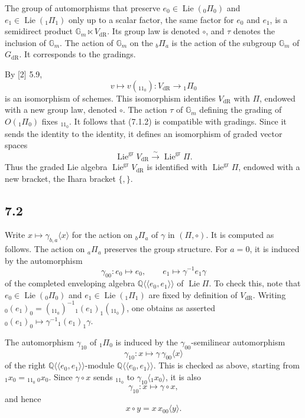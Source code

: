 \documentclass[10pt]{article}
\newcommand{\Q}{\mathbb Q}
\newcommand{\Gm}{\mathbb G_m}
\newcommand{\Lie}{\operatorname{Lie}}
\newcommand{\dR}{\mathrm{dR}}
\begin{document}
The group of automorphisms that preserve $e_0\in\Lie({}_0\Pi_0)$ and $e_1\in\Lie({}_1\Pi_1)$ only up to a scalar factor, the same factor for $e_0$ and $e_1$, is a semidirect product $\Gm\ltimes V_{\dR}$. Its group law is denoted $\circ$, and $\tau$ denotes the inclusion of $\Gm$. The action of $\Gm$ on the ${}_b\Pi_a$ is the action of the subgroup $\Gm$ of $G_{\dR}$. It corresponds to the gradings.

By [2] 5.9,
\begin{equation}
v\longmapsto v({}_11_0):V_{\dR}\longrightarrow {}_1\Pi_0
\tag{7.1.2}
\end{equation}
is an isomorphism of schemes. This isomorphism identifies $V_{\dR}$ with $\Pi$, endowed with a new group law, denoted $\circ$. The action $\tau$ of $\Gm$ defining the grading of $O({}_1\Pi_0)$ fixes ${}_11_0$. It follows that (7.1.2) is compatible with gradings. Since it sends the identity to the identity, it defines an isomorphism of graded vector spaces
\begin{equation}
\Lie^{\mathrm{gr}}V_{\dR}\overset{\sim}{\longrightarrow}\Lie^{\mathrm{gr}}\Pi.
\tag{7.1.3}
\end{equation}
Thus the graded Lie algebra $\Lie^{\mathrm{gr}}V_{\dR}$ is identified with $\Lie^{\mathrm{gr}}\Pi$, endowed with a new bracket, the Ihara bracket $\{,\}$.

\subsection*{7.2}
Write $x\mapsto \gamma_{b,a}\langle x\rangle$ for the action on ${}_b\Pi_a$ of $\gamma$ in $(\Pi,\circ)$. It is computed as follows. The action on ${}_a\Pi_a$ preserves the group structure. For $a=0$, it is induced by the automorphism
\begin{equation}
\gamma_{00}: e_0\longmapsto e_0,
\qquad e_1\longmapsto \gamma^{-1}e_1\gamma
\tag{7.2.1}
\end{equation}
of the completed enveloping algebra $\Q\langle\!\langle e_0,e_1\rangle\!\rangle$ of $\Lie\Pi$. To check this, note that $e_0\in\Lie({}_0\Pi_0)$ and $e_1\in\Lie({}_1\Pi_1)$ are fixed by definition of $V_{\dR}$. Writing ${}_0(e_1)_0=({}_11_0)^{-1}{}_1(e_1)_1({}_11_0)$, one obtains as asserted ${}_0(e_1)_0\mapsto\gamma^{-1}{}_1(e_1)_1\gamma$.

The automorphism $\gamma_{10}$ of ${}_1\Pi_0$ is induced by the $\gamma_{00}$-semilinear automorphism
\begin{equation}
\gamma_{10}:x\longmapsto \gamma\,\gamma_{00}\langle x\rangle
\tag{7.2.2}
\end{equation}
of the right $\Q\langle\!\langle e_0,e_1\rangle\!\rangle$-module $\Q\langle\!\langle e_0,e_1\rangle\!\rangle$. This is checked as above, starting from ${}_1x_0={}_11_0\,{}_0x_0$. Since $\gamma\circ x$ sends ${}_11_0$ to $\gamma_{10}\langle{}_1x_0\rangle$, it is also
\[
\gamma_{10}:x\longmapsto \gamma\circ x,
\]
and hence
\begin{equation}
x\circ y=x\,x_{00}\langle y\rangle .
\tag{7.2.3}
\end{equation}
\end{document}
